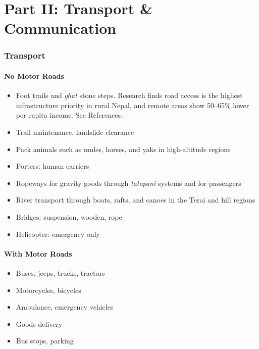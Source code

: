 \documentclass[11pt,a4paper]{article}
\begin{document}
\part{Part II: Transport \& Communication}

\section{Transport}

\subsection{No Motor Roads}
\begin{itemize}
    \item Foot trails and \textit{ghat} stone steps. Research finds road access is the highest infrastructure priority in rural Nepal, 
    and remote areas show 50--65\% lower per capita income. See References.
    \item Trail maintenance, landslide clearance
    \item Pack animals such as mules, horses, and yaks in high-altitude regions
    \item Porters: human carriers
    \item Ropeways for gravity goods through \textit{tatopani} systems and for passengers
    \item River transport through boats, rafts, and canoes in the Terai and hill regions
    \item Bridges: suspension, wooden, rope
    \item Helicopter: emergency only
\end{itemize}

\subsection{With Motor Roads}
\begin{itemize}
    \item Buses, jeeps, trucks, tractors
    \item Motorcycles, bicycles
    \item Ambulance, emergency vehicles
    \item Goods delivery
    \item Bus stops, parking
\end{itemize}
\end{document}
